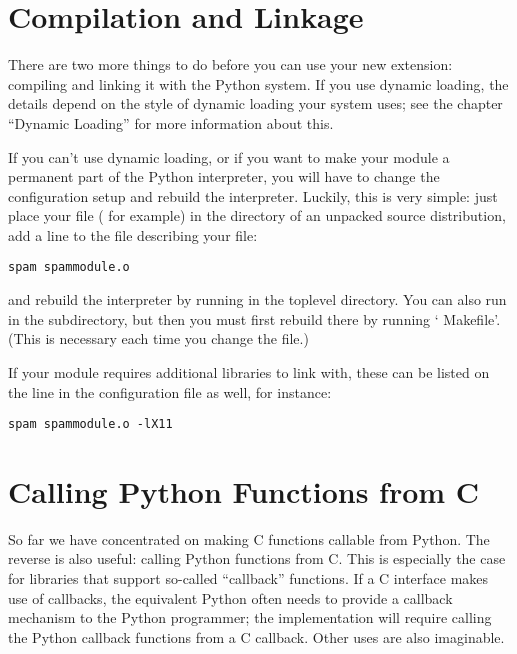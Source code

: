 \documentclass{manual}
\begin{document}
\section{Compilation and Linkage
         \label{compilation}}

There are two more things to do before you can use your new extension:
compiling and linking it with the Python system.  If you use dynamic
loading, the details depend on the style of dynamic loading your
system uses; see the chapter ``Dynamic Loading'' for more information
about this.

If you can't use dynamic loading, or if you want to make your module a
permanent part of the Python interpreter, you will have to change the
configuration setup and rebuild the interpreter.  Luckily, this is
very simple: just place your file ( for example) in
the  directory of an unpacked source distribution, add
a line to the file  describing your file:

\begin{verbatim}
spam spammodule.o
\end{verbatim}

and rebuild the interpreter by running  in the toplevel
directory.  You can also run  in the 
subdirectory, but then you must first rebuild 
there by running ` Makefile'.  (This is necessary each
time you change the  file.)

If your module requires additional libraries to link with, these can
be listed on the line in the configuration file as well, for instance:

\begin{verbatim}
spam spammodule.o -lX11
\end{verbatim}

\section{Calling Python Functions from C
         \label{callingPython}}

So far we have concentrated on making C functions callable from
Python.  The reverse is also useful: calling Python functions from C.
This is especially the case for libraries that support so-called
``callback'' functions.  If a C interface makes use of callbacks, the
equivalent Python often needs to provide a callback mechanism to the
Python programmer; the implementation will require calling the Python
callback functions from a C callback.  Other uses are also imaginable.
\end{document}
